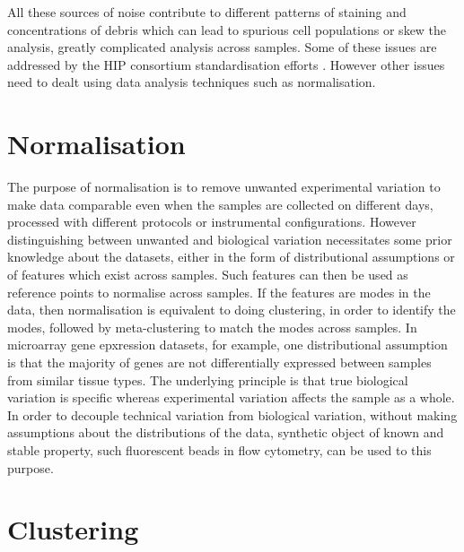 All these sources of noise contribute to different patterns of staining and concentrations of debris
which can lead to spurious cell populations or skew the analysis, greatly complicated analysis across samples.
Some of these issues are addressed by the \gls{HIP} consortium standardisation efforts \citep{Maecker:2012gl}.
However other issues need to dealt using data analysis techniques such as normalisation.

\section{Normalisation}

The purpose of normalisation is to remove unwanted experimental variation to make data comparable even when the samples are
collected on different days, processed with different protocols or instrumental configurations.
However distinguishing between unwanted and biological variation necessitates some prior knowledge about the datasets, either in the form of distributional assumptions
or of features which exist across samples.
Such features can then be used as reference points to normalise across samples.
If the features are modes in the data, then normalisation is equivalent to doing clustering, in order to identify the modes,
followed by meta-clustering to match the modes across samples.
In microarray gene epxression datasets, for example, one distributional assumption is that the majority of genes are not differentially expressed between samples from
similar tissue types.
The underlying principle is that true biological variation is specific whereas experimental variation affects the sample as a whole.
In order to decouple technical variation from biological variation, without making assumptions about the distributions of the data,
synthetic object of known and stable property, such fluorescent beads in flow cytometry, can be used to this purpose.



\section{Clustering}

